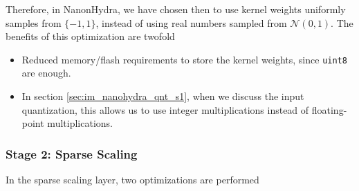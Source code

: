         Therefore, in NanonHydra, we have chosen then to use kernel weights uniformly samples from $\{-1,1\}$, instead of using real numbers sampled from $\mathcal{N}(0,1)$. The benefits of this optimization are twofold

        \begin{itemize}
            \item Reduced memory/flash requirements to store the kernel weights, since \verb|uint8| are enough.
            \item In section \ref{sec:im_nanohydra_qnt_s1}, when we discuss the input quantization, this allows us to use integer multiplications instead of floating-point multiplications.
        \end{itemize}

        \subsubsection{Stage 2: Sparse Scaling}\label{sec:im_nanohydra_algopt_s2}

        In the sparse scaling layer, two optimizations are performed

